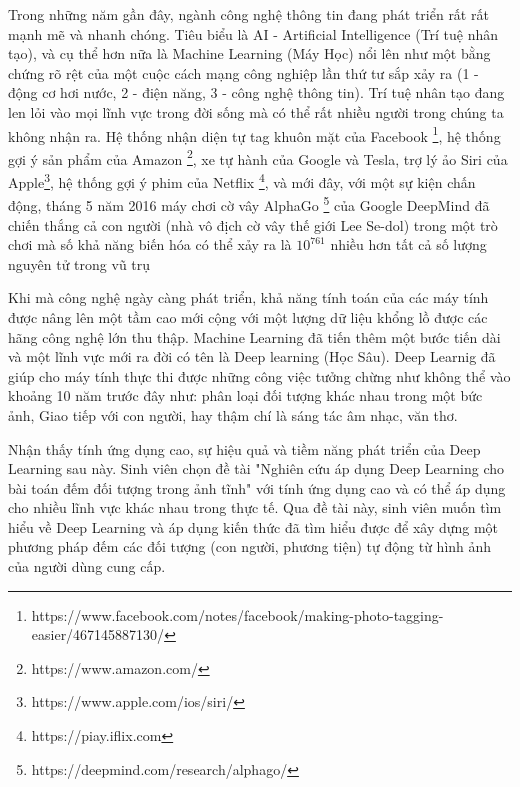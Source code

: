 

\begin{abstracts}    

Trong những năm gần đây, ngành công nghệ thông tin đang phát triển rất rất mạnh mẽ và nhanh chóng. Tiêu biểu  là AI - Artificial Intelligence (Trí tuệ nhân tạo), và cụ thể hơn nữa là Machine Learning (Máy Học) nổi lên như  một bằng chứng rõ rệt của một cuộc cách mạng công nghiệp lần thứ tư sắp xảy ra (1 - động cơ hơi nước, 2 - điện năng, 3 - công nghệ thông tin). Trí tuệ nhân tạo đang len lỏi vào mọi lĩnh vực trong đời sống mà có thể rất nhiều người trong chúng ta không nhận ra. Hệ thống nhận diện tự tag khuôn mặt của Facebook \footnote{https://www.facebook.com/notes/facebook/making-photo-tagging-easier/467145887130/}, hệ thống gợi ý sản phẩm của Amazon \footnote{https://www.amazon.com/}, xe tự hành của Google và Tesla, trợ lý ảo Siri của Apple\footnote{https://www.apple.com/ios/siri/}, hệ thống gợi ý phim của Netflix \footnote{https://piay.iflix.com}, và mới đây, với một sự kiện chấn động, tháng 5 năm 2016 máy chơi cờ vây AlphaGo \footnote{https://deepmind.com/research/alphago/} của Google DeepMind đã chiến thắng cả con người (nhà vô địch cờ vây thế giới Lee Se-dol) trong một trò chơi mà số khả năng biến hóa có thể xảy ra là $10^{761}$ nhiều hơn tất cả số lượng nguyên tử trong vũ trụ \par
	Khi mà công nghệ ngày càng phát triển, khả năng tính toán của các máy tính được nâng lên một tầm cao mới cộng với một lượng dữ liệu khổng lồ được các hãng công nghệ lớn thu thập. Machine Learning đã tiến thêm một bước tiến dài và một lĩnh vực mới ra đời có tên là Deep learning (Học Sâu). Deep Learnig đã giúp cho máy tính thực thi được những công việc tưởng chừng như không thể vào khoảng 10 năm trước đây như: phân loại đối tượng khác nhau trong một bức ảnh, Giao tiếp với con người, hay thậm chí là sáng tác âm nhạc, văn thơ. \par 
	Nhận thấy tính ứng dụng cao, sự hiệu quả và tiềm năng phát triển của Deep Learning sau này. Sinh viên chọn đề tài "Nghiên cứu áp dụng Deep Learning cho bài toán đếm đối tượng trong ảnh tĩnh" với tính ứng dụng cao và có thể áp dụng cho nhiều lĩnh vực khác nhau trong thực tế. Qua đề tài này, sinh viên muốn tìm hiểu về Deep Learning và áp dụng kiến thức đã tìm hiểu được để xây dựng một phương pháp đếm các đối tượng (con người, phương tiện) tự động từ hình ảnh của người dùng cung cấp.  \par 


\end{abstracts}
 